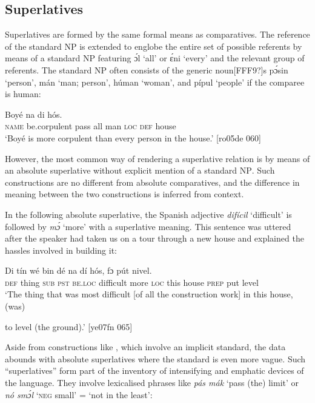 \subsection{Superlatives}

Superlatives are formed by the same formal means as comparatives. The reference of the standard NP is extended to englobe the entire set of possible referents by means of a standard NP featuring ɔ́l ‘all’ or ɛ́ni ‘every’ and the relevant group of referents. The standard NP often consists of the generic noun[FFF9?]s pɔ́sin ‘person’, mán ‘man; person’, húman ‘woman’, and pípul ‘people’ if the comparee is human:


\ea%
    \label{ex:key:489}
    \gll Boyé            na  di  hós.\\
\textsc{name}  be.corpulent  pass  all  man    \textsc{loc}  \textsc{def}  house\\

\glt ‘Boyé is more corpulent than every person in the house.’ [ro05de 060]
\z

However, the most common way of rendering a superlative relation is by means of an absolute superlative without explicit mention of a standard \textsc{NP}. Such constructions are no different from absolute comparatives, and the difference in meaning between the two constructions is inferred from context. 


In the following absolute superlative, the Spanish adjective \textit{difícil} ‘difficult’ is followed by \textit{mɔ́} ‘more’ with a superlative meaning. This sentence was uttered after the speaker had taken us on a tour through a new house and explained the hassles involved in building it:



\ea%
    \label{ex:key:490}
    \gll Di  tín    wé  bin  dé          na  dí  hós,    fɔ  pút  nivel.\\
\textsc{def}  thing  \textsc{sub}  \textsc{pst}  \textsc{be.loc}  difficult  more  \textsc{loc}  this  house  \textsc{prep}  put  level\\

\glt ‘The thing that was most difficult [of all the construction work] in this house, (was) 


\glt to level (the ground).’ [ye07fn 065]
\z

Aside from constructions like , which involve an implicit standard, the data abounds with absolute superlatives where the standard is even more vague. Such “superlatives” form part of the inventory of intensifying and emphatic devices of the language. They involve lexicalised phrases like \textit{pás mák} ‘pass (the) limit’ or \textit{nó smɔ́l} ‘\textsc{neg} small’ = ‘not in the least’:


